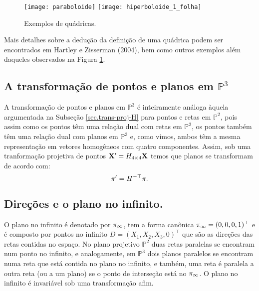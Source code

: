 \begin{figure}[!htb]{\textwidth}
\caption{Exemplos de qu\'adricas.}
\texttt{[image: paraboloide]}\hfill
\texttt{[image: hiperboloide\_1\_folha]}\hfill
{}
\label{quadricas2}
\end{figure}
Mais detalhes sobre a dedução da definição de uma quádrica podem ser encontrados em Hartley e Zisserman (2004), bem como outros exemplos além daqueles observados na Figura \ref{quadricas2}.\\
\subsection{A transformação de pontos e planos em $\mathbb{P}^3$}\label{sec.trans-pontos-planos-P3}

A transformação de pontos e planos em $\mathbb{P}^3$ é inteiramente análoga àquela argumentada na Subseção \ref{sec.trans-proj-H} para pontos e retas em $\mathbb{P}^2$, pois assim como os pontos têm uma relação dual com retas em $\mathbb{P}^2$, os pontos também têm uma relação dual com planos em $\mathbb{P}^3$ e, como vimos, ambos têm a mesma representação em vetores homogêneos com quatro componentes. Assim, sob uma tranformação projetiva de pontos $\mathbf{X}'=H_{4\times4}\mathbf{X}$ temos que planos se transformam de acordo com:
\begin{equation*}
\pi'=H^{-\top}\pi.
\end{equation*}
\subsection{Direções e o plano no infinito.}\label{sec.direcoes-plano-infinito}

O plano no infinito é denotado por $\pi_\infty$, tem a forma canônica $\pi_\infty=(0,0,0,1)^\top$ e é composto por pontos no infinito $D=(X_1,X_2,X_3,0)^\top$ que são as direções das retas contidas no espaço. No plano projetivo $\mathbb{P}^2$ duas retas paralelas se encontram num ponto no infinito, e analogamente, em  $\mathbb{P}^3$ dois planos paralelos se encontram numa reta que está contida no plano no infinito, e também, uma reta é paralela a outra reta (ou a um plano) se o ponto de interseção está no $\pi_\infty$. O plano no infinito é invariável sob uma transformação afim.

